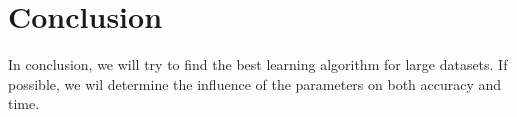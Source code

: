 \documentclass[a4paper,10pt]{scrartcl}
\begin{document}
\section{Conclusion}
In conclusion, we will try to find the best learning algorithm for large datasets.
If possible, we wil determine the influence of the parameters on both accuracy and time.

\makeatletter
\def\url@leostyle{%
  \@ifundefined{selectfont}{\def\UrlFont{\sf}}{\def\UrlFont{\small\ttfamily}}}
\makeatother


\end{document}

